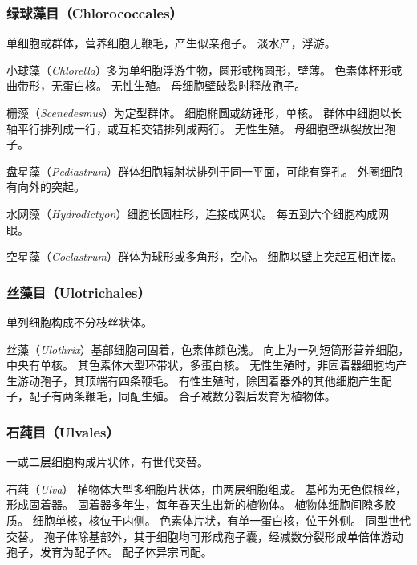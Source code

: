 \documentclass[11pt]{article}
\begin{document}
\subsubsection{绿球藻目（Chlorococcales）}
单细胞或群体，营养细胞无鞭毛，产生似亲孢子。
淡水产，浮游。

\newline

小球藻（\textit{Chlorella}）多为单细胞浮游生物，圆形或椭圆形，壁薄。
色素体杯形或曲带形，无蛋白核。
无性生殖。
母细胞壁破裂时释放孢子。

\newline

栅藻（\textit{Scenedesmus}）为定型群体。
细胞椭圆或纺锤形，单核。
群体中细胞以长轴平行排列成一行，或互相交错排列成两行。
无性生殖。
母细胞壁纵裂放出孢子。

\newline

盘星藻（\textit{Pediastrum}）群体细胞辐射状排列于同一平面，可能有穿孔。
外圈细胞有向外的突起。

\newline

水网藻（\textit{Hydrodictyon}）细胞长圆柱形，连接成网状。
每五到六个细胞构成网眼。

\newline

空星藻（\textit{Coelastrum}）群体为球形或多角形，空心。
细胞以壁上突起互相连接。

\subsubsection{丝藻目（Ulotrichales）}
单列细胞构成不分枝丝状体。

\newline

丝藻（\textit{Ulothrix}）基部细胞司固着，色素体颜色浅。
向上为一列短筒形营养细胞，中央有单核。
其色素体大型环带状，多蛋白核。
无性生殖时，非固着器细胞均产生游动孢子，其顶端有四条鞭毛。
有性生殖时，除固着器外的其他细胞产生配子，配子有两条鞭毛，同配生殖。
合子减数分裂后发育为植物体。

\subsubsection{石莼目（Ulvales）}
一或二层细胞构成片状体，有世代交替。

\newline

石莼（\textit{Ulva}）
植物体大型多细胞片状体，由两层细胞组成。
基部为无色假根丝，形成固着器。
固着器多年生，每年春天生出新的植物体。
植物体细胞间隙多胶质。
细胞单核，核位于内侧。
色素体片状，有单一蛋白核，位于外侧。
同型世代交替。
孢子体除基部外，其于细胞均可形成孢子囊，经减数分裂形成单倍体游动孢子，发育为配子体。
配子体异宗同配。
\end{document}
